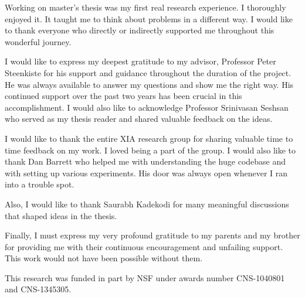 \acknowledgements

\setcounter{page}{2}

Working on master's thesis was my first real research experience. I
thoroughly enjoyed it. It taught me to think about problems in a
different way. I would like to thank everyone who directly or
indirectly supported me throughout this wonderful journey.

I would like to express my deepest gratitude to my advisor, Professor
Peter Steenkiste for his support and guidance throughout the duration
of the project. He was always available to answer my questions and
show me the right way. His continued support over the past two years
has been crucial in this accomplishment. I would also like to
acknowledge Professor Srinivasan Seshsan who served as my thesis
reader and shared valuable feedback on the ideas.

I would like to thank the entire XIA research group for sharing
valuable time to time feedback on my work. I loved being a part of the
group. I would also like to thank Dan Barrett who helped me with
understanding the huge codebase and with setting up various
experiments. His door was always open whenever I ran into a trouble
spot.

Also, I would like to thank Saurabh Kadekodi for many meaningful
discussions that shaped ideas in the thesis.

Finally, I must express my very profound gratitude to my parents and
my brother for providing me with their continuous encouragement and
unfailing support. This work would not have been possible without
them.

This research was funded in part by NSF under awards number
CNS-1040801 and CNS-1345305.

